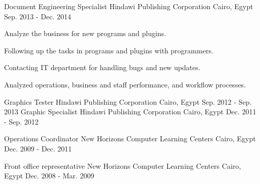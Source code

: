 \begin{cventries}
  \cventry
    {Document Engineering Specialist} %
    {Hindawi Publishing Corporation} %
    {Cairo, Egypt} %
    {Sep. 2013 - Dec. 2014} %
    {
      \begin{cvitems} %
        \item {Analyze the business for new programs and plugins.}
        \item {Following up the tasks in programs and plugins with programmers.}
        \item {Contacting IT department for handling bugs and new updates.}
        \item {Analyzed operations, business and staff performance, and workflow processes.}
      \end{cvitems}
    }
  \cventry
    {Graphics Tester} %
    {Hindawi Publishing Corporation} %
    {Cairo, Egypt} %
    {Sep. 2012 - Sep. 2013} %
    {
    }
  \cventry
    {Graphic Specialist} %
    {Hindawi Publishing Corporation} %
    {Cairo, Egypt} %
    {Dec. 2011 - Sep. 2012} %
    {}

  \cventry
    {Operations Coordinator} %
    {New Horizons Computer Learning Centers} %
    {Cairo, Egypt} %
    {Dec. 2009 - Dec. 2011} %
    {}

  \cventry
    {Front office representative} %
    {New Horizons Computer Learning Centers} %
    {Cairo, Egypt} %
    {Dec. 2008 - Mar. 2009} %
    {}

\end{cventries}
